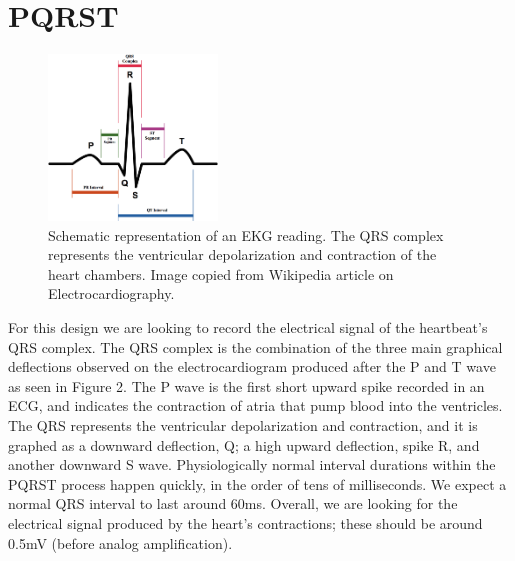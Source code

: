 \documentclass[11pt, oneside]{article}   	%
\begin{document}
\pagebreak

\section{PQRST}

\begin{figure}
	\includegraphics[width=0.4\textwidth]{PQRST}
	\caption{Schematic representation of an EKG reading.  The QRS complex represents the ventricular depolarization and contraction of the heart chambers. \cite{wikiimage} Image copied from Wikipedia article on Electrocardiography.}
\end{figure}
	\onehalfspace

\par For this design we are looking to record the electrical signal of the heartbeat's QRS complex. The QRS complex is the combination of the three main graphical deflections observed on the electrocardiogram produced after the P and T wave as seen in Figure 2. The P wave is the first short upward spike recorded in an ECG, and indicates the contraction of atria that pump blood into the ventricles. The QRS represents the ventricular depolarization and contraction, and it is graphed as a downward deflection, Q; a high upward deflection, spike R, and another downward S wave. Physiologically normal interval durations within the PQRST process happen quickly, in the order of tens of milliseconds. We expect a normal QRS interval to last around 60ms. Overall, we are looking for the electrical signal produced by the heart's contractions; these should be around 0.5mV (before analog amplification). \cite{karptalk} 
\end{document}
